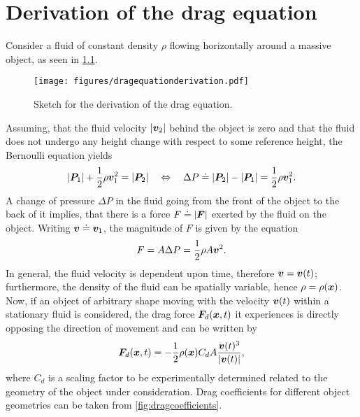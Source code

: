 \documentclass[a4paper,11pt]{report}
\begin{document}
\chapter{Derivation of the drag equation}
Consider a fluid of constant density $\rho$ flowing horizontally around a massive object, as seen in \cref{fig:dragequationderivation}.
\begin{figure}[h]
\centering
\texttt{[image: figures/dragequationderivation.pdf]}
\caption{Sketch for the derivation of the drag equation.}
\label{fig:dragequationderivation}
\end{figure}
Assuming, that the fluid velocity $|\bm{v}_2|$ behind the object is zero and that the fluid does not undergo any height change with respect to some reference height, the Bernoulli equation yields \begin{equation}
|\bm{P}_1| + \frac{1}{2}\rho \bm{v}_1^2 = |\bm{P}_2| \quad \Leftrightarrow \quad \Delta P \doteq |\bm{P}_2|-|\bm{P}_1| = \frac{1}{2}\rho \bm{v}_1^2.
\end{equation} A change of pressure $\Delta P$ in the fluid going from the front of the object to the back of it implies, that there is a force $F \doteq |\bm{F}|$ exerted by the fluid on the object. Writing $\bm{v} \doteq \bm{v}_1$, the magnitude of $F$ is given by the equation \begin{equation}
F = A \Delta P = \frac{1}{2}\rho A \bm{v}^2.
\end{equation} In general, the fluid velocity is dependent upon time, therefore $\bm{v} = \bm{v}(t)$; furthermore, the density of the fluid can be spatially variable, hence $\rho = \rho(\bm{x})$. Now, if an object of arbitrary shape moving with the velocity $\bm{v}(t)$ within a stationary fluid is considered, the drag force $\bm{F}_d(\bm{x},t)$ it experiences is directly opposing the direction of movement and can be written by \begin{equation}
\bm{F}_d(\bm{x},t) = - \frac{1}{2}\rho(\bm{x})C_d A \frac{\bm{v}(t)^3}{|\bm{v}(t)|},
\end{equation} where $C_d$ is a scaling factor to be experimentally determined related to the geometry of the object under consideration. Drag coefficients for different object geometries can be taken from \cref{fig:dragcoefficients}.
\end{document}
